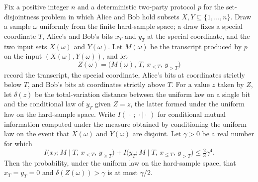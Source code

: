 \begin{theorem}
\label{CommunicationComplexity.Functions.Disjointness.RandomizedLowerBound.measureReal_specialZeroZero_inter_yDistance_bad_le}
\leanok
{}
Fix a positive integer $n$ and a deterministic two-party protocol $p$ for the
set-disjointness problem in which Alice and Bob hold subsets $X, Y \subseteq \{1, \dots,
n\}$. Draw a sample $\omega$ uniformly from the finite hard-sample space; a draw fixes a
special coordinate $T$, Alice's and Bob's bits $x_T$ and $y_T$ at the special
coordinate, and the two input sets $X(\omega)$ and $Y(\omega)$. Let $M(\omega)$ be the
transcript produced by $p$ on the input $(X(\omega), Y(\omega))$, and let
\[ Z(\omega) = \bigl(M(\omega),\, T,\, x_{<T},\, y_{>T}\bigr) \]
record the transcript, the special coordinate, Alice's bits at coordinates strictly
below $T$, and Bob's bits at coordinates strictly above $T$. For a value $z$ taken by
$Z$, let $\delta(z)$ be the total-variation distance between the uniform law on a single
bit and the conditional law of $y_T$ given $Z = z$, the latter formed under the uniform
law on the hard-sample space. Write $I(\,\cdot\,;\,\cdot \mid \cdot\,)$ for conditional
mutual information computed under the measure obtained by conditioning the uniform law
on the event that $X(\omega)$ and $Y(\omega)$ are disjoint. Let $\gamma > 0$ be a real
number for which
\[ I\bigl(x_T ; M \mid T,\, x_{<T},\, y_{\ge T}\bigr) + I\bigl(y_T ; M \mid T,\, x_{\le T},\, y_{>T}\bigr) \le \tfrac{2}{3}\gamma^{4}. \]
Then the probability, under the uniform law on the hard-sample space, that $x_T = y_T =
0$ and $\delta(Z(\omega)) > \gamma$ is at most $\gamma/2$.
\end{theorem}

